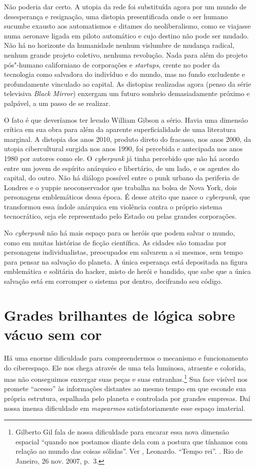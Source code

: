Não poderia dar certo. A utopia da rede foi substituída agora por um
mundo de desesperança e resignação, uma distopia presentificada onde o
ser humano sucumbe exausto aos automatismos e ditames do neoliberalismo,
como se viajasse numa aeronave ligada em piloto automático e cujo
destino não pode ser mudado. Não há no horizonte da humanidade nenhum
vislumbre de mudança radical, nenhum grande projeto coletivo, nenhuma
revolução. Nada para além do projeto pós"-humano californiano de corporações e \emph{startups}, crente no poder da tecnologia como salvadora do indivíduo e do mundo, mas no fundo excludente e profundamente vinculado ao capital. As distopias realizadas agora (penso da série televisiva
\emph{Black Mirror}) enxergam um futuro sombrio demasiadamente próximo e
palpável, a um passo de se realizar.

O fato é que deveríamos ter levado William Gibson a sério. Havia uma dimensão crítica em sua obra para além da aparente superficialidade de uma literatura marginal. A distopia dos anos 2010, produto direto do fracasso, nos anos 2000, da
utopia cibercultural surgida nos anos 1990, foi percebida e antecipada
nos anos 1980 por autores como ele. O \emph{cyberpunk} já tinha percebido que não há acordo
entre um jovem de espírito anárquico e libertário, de um lado, e os
agentes do capital, do outro. Não há diálogo possível entre o punk
urbano da periferia de Londres e o yuppie neoconservador que trabalha na
bolsa de Nova York, dois personagens emblemáticos dessa época. É desse
atrito que nasce o \emph{cyberpunk}, que transformou essa índole
anárquica em violência contra o próprio sistema tecnocrático, seja ele
representado pelo Estado ou pelas grandes corporações.

No \emph{cyberpunk} não há mais espaço para os heróis que podem salvar o mundo,
como em muitas histórias de ficção científica. As cidades são tomadas
por personagens individualistas, preocupados em salvarem a si mesmos, sem
tempo para pensar na salvação do planeta. A única esperança está
depositada na figura emblemática e solitária do hacker, misto de herói e
bandido, que sabe que a única salvação está em corromper o sistema por
dentro, decifrando seu código.

\chapter{Grades brilhantes de lógica sobre vácuo sem cor}

Há uma enorme dificuldade para compreendermos o mecanismo e
funcionamento do ciberespaço. Ele nos chega através de uma tela
luminosa, atraente e colorida, mas não conseguimos enxergar suas peças e
suas entranhas.\footnote{Gilberto Gil fala de nossa dificuldade para
  encarar essa nova dimensão espacial ``quando nos postamos diante dela
  com a postura que tínhamos com relação ao mundo das coisas sólidas''.
  Ver , Leonardo. ``Tempo rei''. {}. Rio de Janeiro, 26
  nov. 2007, p.~3.} Sua face visível nos promete ``acesso'' às
informações distantes ao mesmo tempo em que esconde sua própria
estrutura, espalhada pelo planeta e controlada por grandes empresas. Daí
nossa imensa dificuldade em \emph{mapearmos} satisfatoriamente esse
espaço imaterial.

